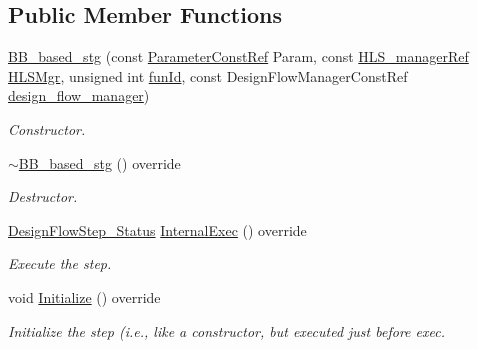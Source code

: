 \subsection*{Public Member Functions}
\begin{DoxyCompactItemize}
\item 
\hyperlink{classBB__based__stg_a27b4e9f2b0bf76564a5eafc1b72e69f1}{B\+B\+\_\+based\+\_\+stg} (const \hyperlink{Parameter_8hpp_a37841774a6fcb479b597fdf8955eb4ea}{Parameter\+Const\+Ref} Param, const \hyperlink{hls__manager_8hpp_acd3842b8589fe52c08fc0b2fcc813bfe}{H\+L\+S\+\_\+manager\+Ref} \hyperlink{classHLS__step_ade85003a99d34134418451ddc46a18e9}{H\+L\+S\+Mgr}, unsigned int \hyperlink{classHLSFunctionStep_a3e6434fd86c698b0c70520b859bff5b0}{fun\+Id}, const Design\+Flow\+Manager\+Const\+Ref \hyperlink{classDesignFlowStep_ab770677ddf087613add30024e16a5554}{design\+\_\+flow\+\_\+manager})
\begin{DoxyCompactList}\small\item\em Constructor. \end{DoxyCompactList}\item 
\hyperlink{classBB__based__stg_a92039360b8abd4fbb1717effc57afd4e}{$\sim$\+B\+B\+\_\+based\+\_\+stg} () override
\begin{DoxyCompactList}\small\item\em Destructor. \end{DoxyCompactList}\item 
\hyperlink{design__flow__step_8hpp_afb1f0d73069c26076b8d31dbc8ebecdf}{Design\+Flow\+Step\+\_\+\+Status} \hyperlink{classBB__based__stg_ada4c8f3601fd2e5dee0ccffe8bfdd430}{Internal\+Exec} () override
\begin{DoxyCompactList}\small\item\em Execute the step. \end{DoxyCompactList}\item 
void \hyperlink{classBB__based__stg_a68123e6fdc9a397be06ee3058e217ff0}{Initialize} () override
\begin{DoxyCompactList}\small\item\em Initialize the step (i.\+e., like a constructor, but executed just before exec. \end{DoxyCompactList}\end{DoxyCompactItemize}
